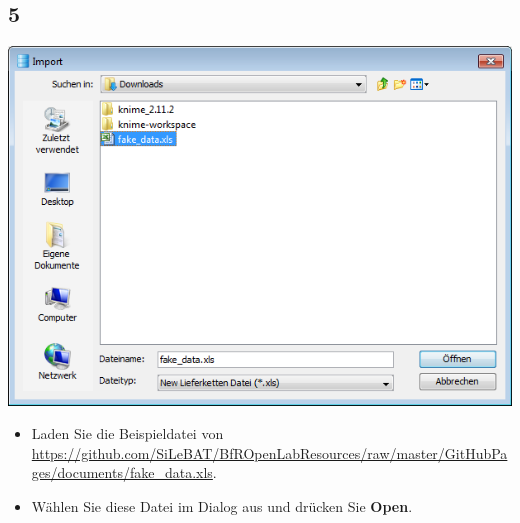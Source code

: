 \documentclass{beamer}
\begin{document}
\subsection{5}
\begin{frame}
	\begin{center}
  		\includegraphics[height=0.6\textheight]{5.png}
	\end{center}
	\begin{itemize}
		\item Laden Sie die Beispieldatei von \url{https://github.com/SiLeBAT/BfROpenLabResources/raw/master/GitHubPages/documents/fake_data.xls}.
		\item Wählen Sie diese Datei im Dialog aus und drücken Sie \textbf{Open}.
	\end{itemize}
\end{frame}
\end{document}
